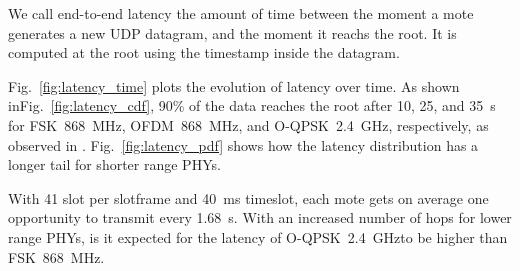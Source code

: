 \documentclass[sensors,article,submit,moreauthors,pdftex]{Definitions/mdpi}
\newcommand{\fsk}           {FSK~868~MHz}
\newcommand{\oqpsk}         {O-QPSK~2.4~GHz}
\newcommand{\ofdm}          {OFDM~868~MHz}
\begin{document}

We call end-to-end latency the amount of time between the moment a mote generates a new UDP datagram, and the moment it reachs the root.
It is computed at the root using the timestamp inside the datagram.


Fig.~\ref{fig:latency_time} plots the evolution of latency over time.
As shown inFig.~\ref{fig:latency_cdf}, 90\% of the data reaches the root after 10, 25, and 35~s for \fsk, \ofdm, and \oqpsk,  respectively, as observed in .
Fig.~\ref{fig:latency_pdf} shows how the latency distribution has a longer tail for shorter range PHYs.


With 41 slot per slotframe and 40~ms timeslot, each mote gets on average one opportunity to transmit every 1.68~s.
With an increased number of hops for lower range PHYs, is it expected for the latency of \oqpsk to be higher than \fsk.
\end{document}
